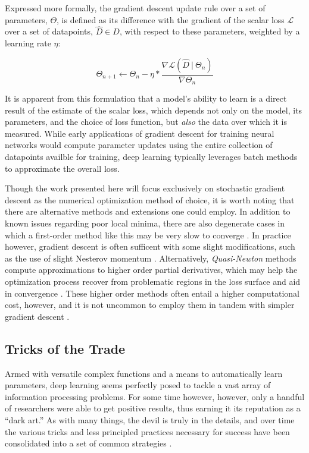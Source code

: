 Expressed more formally, the gradient descent update rule over a set of parameters, $\Theta$, is defined as its difference with the gradient of the scalar loss $\mathcal{L}$ over a set of datapoints, $\hat{D} \in D$, with respect to these parameters, weighted by a learning rate $\eta$:

\begin{equation}
\label{eq:updaterule}
\Theta_{n+1} \leftarrow \Theta_n - \eta * \frac{ \nabla \mathcal{L}(\hat{D}~|~\Theta_n)}{\nabla \Theta_n}
\end{equation}

\noindent It is apparent from this formulation that a model's ability to learn is a direct result of the estimate of the scalar loss, which depends not only on the model, its parameters, and the choice of loss function, but \emph{also} the data over which it is measured.
While early applications of gradient descent for training neural networks would compute parameter updates using the entire collection of datapoints availble for training, deep learning typically leverages batch methods to approximate the overall loss.

Though the work presented here will focus exclusively on stochastic gradient descent as the numerical optimization method of choice, it is worth noting that there are alternative methods and extensions one could employ.
In addition to known issues regarding poor local minima, there are also degenerate cases in which a first-order method like this may be very slow to converge \cite{badSGD}.
In practice however, gradient descent is often sufficent with some slight modifications, such as the use of slight Nesterov momentum \cite{Nesterov}.
Alternatively, \emph{Quasi-Newton} methods compute approximations to higher order partial derivatives, which may help the optimization process recover from problematic regions in the loss surface and aid in convergence  \cite{BFGS}.
These higher order methods often entail a higher computational cost, however, and it is not uncommon to employ them in tandem with simpler gradient descent \cite{Koray}.


\subsection{Tricks of the Trade}
\label{subsec:tricks}

Armed with versatile complex functions and a means to automatically learn parameters, deep learning seems perfectly posed to tackle a vast array of information processing problems.
For some time however, however, only a handful of researchers were able to get positive results, thus earning it its reputation as a ``dark art.''
As with many things, the devil is truly in the details, and over time the various tricks and less principled practices necessary for success have been consolidated into a set of common strategies \cite{Bengio2012Practical}.


